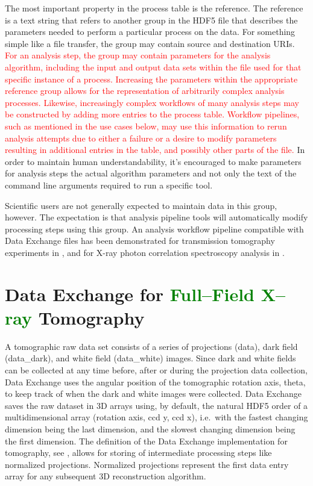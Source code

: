 \documentclass[pdf]{iucr}              %
\begin{document}
The most important property in the process table is the reference. The reference is a text string that refers to another group in the HDF5 file that describes the parameters needed to perform a particular process on the data. For something simple like a file transfer, the group may contain source and destination URIs. \textcolor{red}{For an analysis step, the group may contain parameters for the analysis algorithm, including the input and output data sets within the file used for that specific instance of a process. Increasing the parameters within the appropriate reference group allows for the representation of arbitrarily complex analysis processes. Likewise, increasingly complex workflows of many analysis steps may be constructed by adding more entries to the process table. Workflow pipelines, such as mentioned in the use cases below, may use this information to rerun analysis attempts due to either a failure or a desire to modify parameters resulting in additional entries in the table, and possibly other parts of the file.} In order to maintain human understandability, it's encouraged to make parameters for analysis steps the actual algorithm parameters and not only the text of the command line arguments required to run a specific tool.

Scientific users are not generally expected to maintain data in this group, however. The expectation is that analysis pipeline tools will automatically modify processing steps using this group. An analysis workflow pipeline compatible with Data Exchange files has been demonstrated for transmission tomography experiments in \cite{schwarz_icalepcs_2013}, and for X-ray photon correlation spectroscopy analysis in \cite{khan_icalepcs_2013}.

\section{Data Exchange for \textcolor{green}{Full--Field X--ray} Tomography}

A tomographic raw data set consists of a series of projections (data), dark field (data\_dark), and white field (data\_white) images. Since dark and white fields can be collected at any time before, after or during the projection data collection, Data Exchange uses the angular position of the tomographic rotation axis, theta, to keep track of when the dark and white images were collected. Data Exchange saves the raw dataset in 3D arrays using, by default, the natural HDF5 order of a multidimensional array (rotation axis, ccd y, ccd x), i.e.\  with the fastest changing dimension being the last dimension, and the slowest changing dimension being the first dimension. The definition of the Data Exchange implementation for tomography, see \cite{data_exchange}, allows for storing of intermediate processing steps like normalized projections. Normalized projections represent the first data entry array for any subsequent 3D reconstruction algorithm.
\end{document}
